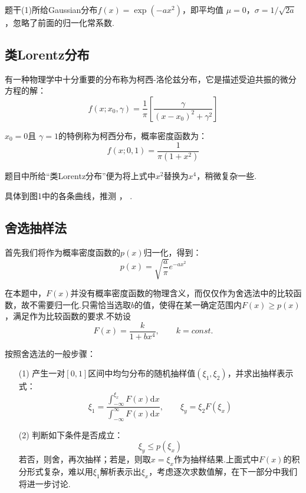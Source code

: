 \documentclass[12pt,a4paper,utf8]{ctexart}
\begin{document}
题干(1)所给Gaussian分布$f(x) = \exp (-ax^2)$，即平均值
$\mu=0$，$\sigma = 1/ \sqrt{2a}$，忽略了前面的归一化常系数.

\subsection{类Lorentz分布}

有一种物理学中十分重要的分布称为柯西-洛伦兹分布，它是描述受迫共振的微分方程的解：
\begin{equation}
    f(x;x_0,\gamma) = \frac{1}{\pi} \left[ \frac{\gamma}{(x-x_0)^2 + \gamma^2}
    \right]
\end{equation}

$x_0 = 0$且 $\gamma = 1$的特例称为柯西分布，概率密度函数为：
\begin{equation}
    f(x;0,1) = \frac{1}{\pi(1+x^2)}
\end{equation}

题目中所给“类Lorentz分布”便为将上式中$x^2$替换为$x^4$，稍微复杂一些.

具体到图1中的各条曲线，推测
\color{red}{红色为Gaussian分布} \color{black}，\color{blue}{另两条可能是}
\color{green}{类Lorentz分布}\color{black}.

\subsection{舍选抽样法}

首先我们将作为概率密度函数的$p(x)$归一化，得到：
\begin{equation}
    p(x) = \sqrt{ \frac{a}{\pi}}e^{-ax^2}
\end{equation}

在本题中，$F(x)$并没有概率密度函数的物理含义，而仅仅作为舍选法中的比较函数，故不需要归一化.只需恰当选取$b$的值，使得在某一确定范围内$F(x)
\geq p(x)$，满足作为比较函数的要求.不妨设
\begin{equation}
    F(x) = \frac{k}{1+bx^4},\qquad k = const.
\end{equation}

按照舍选法的一般步骤：
\begin{enumerate}
    \item[(1)] 产生一对$[0,1]$区间中均匀分布的随机抽样值$(\xi_1 ,
        \xi_2)$，并求出抽样表示式：
        \begin{equation}
            \xi_1 = \frac{\int _{-\infty} ^{\xi_x} F(x) \textrm{d}x }{\int
            _{-\infty} ^{\infty} F(x) \textrm{d}x},\qquad \xi_y = \xi_2 F(\xi_x)
        \end{equation}

    \item[(2)] 判断如下条件是否成立：
        \begin{equation}
            \xi_y \leq p(\xi_x)
        \end{equation}
        若否，则舍，再次抽样；若是，则取$x = \xi
        _x$作为抽样结果.上面式中$F(x)$的积分形式复杂，难以用$\xi_1$解析表示出$\xi_x$，考虑逐次求数值解，在下一部分中我们将进一步讨论.
\end{enumerate}
\end{document}
